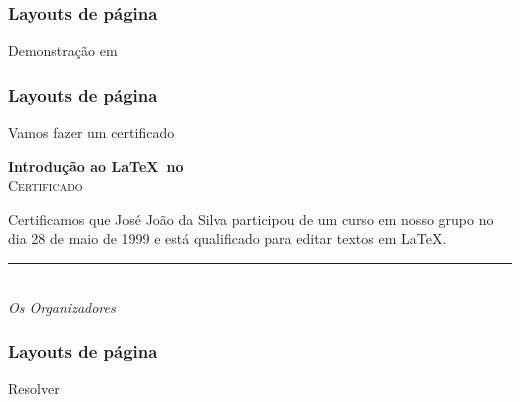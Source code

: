 \begin{frame}
  \frametitle{Layouts de página}
  \huge
  Demonstração em 
\end{frame}

\begin{frame}
  \frametitle{Layouts de página}
  \huge
  Vamos fazer um certificado
\end{frame}

\begin{frame}[plain]

  {\huge\textbf{Introdução ao \LaTeX\ no \IMPATech}}\\[2em]
  {\LARGE\textsc{Certificado}}

  \noindent Certificamos que José João da Silva participou de um curso em nosso
  grupo no dia 28 de maio de 1999 e está qualificado para editar textos em
  \LaTeX.

  \vfill
  \rule{}{.4pt}\\
  \emph{Os Organizadores}\\
  \emph{\IMPATech}

\end{frame}

\begin{frame}
  \frametitle{Layouts de página}
  \huge
  Resolver 
\end{frame}
